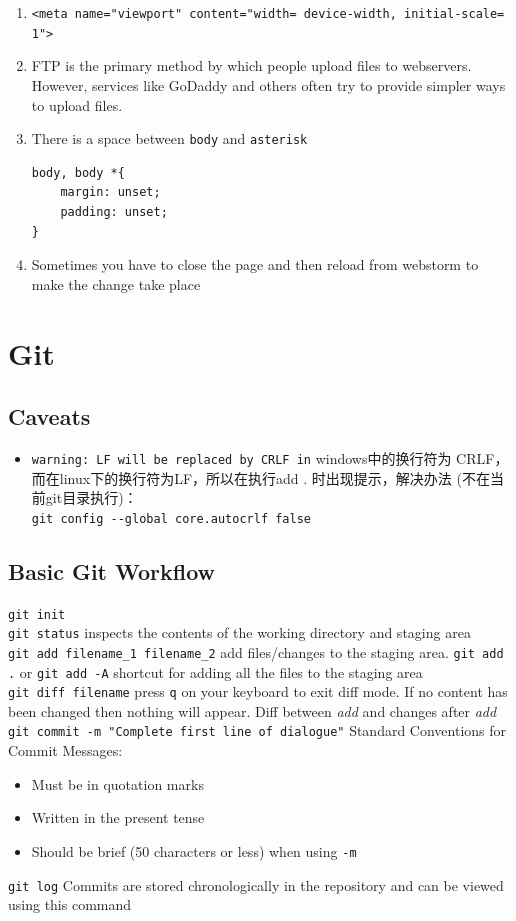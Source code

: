 \documentclass[a4paper, 12pt]{article}
\begin{document}
\begin{enumerate}
\item \verb|<meta name="viewport" content="width= device-width, initial-scale= 1">|

\item  FTP is the primary method by which people upload files to webservers. However, services like GoDaddy and others often try to provide simpler ways to upload files.

\item There is a space between \verb|body| and \verb|asterisk|
\begin{verbatim}
body, body *{
    margin: unset;
    padding: unset;
}
\end{verbatim}

\item Sometimes you have to close the page and then reload from webstorm to make the change take place
\end{enumerate}


\section{Git}

\subsection{Caveats}
\begin{itemize}
\item \verb|warning: LF will be replaced by CRLF in| windows中的换行符为 CRLF， 而在linux下的换行符为LF，所以在执行add . 时出现提示，解决办法 (不在当前git目录执行)：\\
\verb|git config --global core.autocrlf false|
\end{itemize}

\subsection{Basic Git Workflow}
\noindent\verb|git init|\\
\verb|git status| inspects the contents of the working directory and staging area\\
\verb|git add filename_1 filename_2| add files/changes to the staging area. \verb|git add .| or \verb|git add -A| shortcut for adding all the files to the staging area \\
\verb|git diff filename| press \verb|q| on your keyboard to exit diff mode. If no content has been changed then nothing will appear. Diff between \textit{add} and changes after \textit{add} \\ 
\verb|git commit -m "Complete first line of dialogue"| Standard Conventions for Commit Messages:
\begin{itemize}
\item Must be in quotation marks
\item Written in the present tense
\item Should be brief (50 characters or less) when using \verb|-m|
\end{itemize}
\verb|git log| Commits are stored chronologically in the repository and can be viewed using this command
\end{document}
